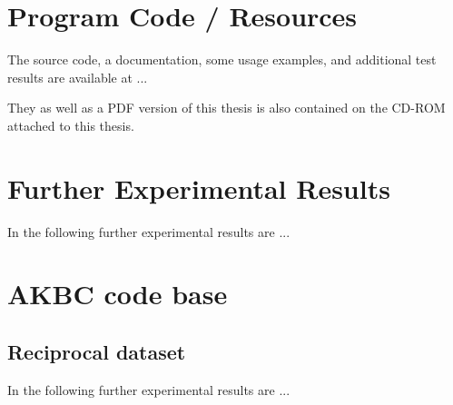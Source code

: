 \appendix



\chapter{Program Code / Resources}
\label{cha:appendix-a}

The source code, a documentation, some usage examples, and additional test results are available at ...

They as well as a PDF version of this thesis is also contained on the CD-ROM attached to this thesis.

\chapter{Further Experimental Results}
\label{cha:appendix-b}

In the following further experimental results are ...


\chapter{AKBC code base}
\label{cha:appendix-b}

\section{Reciprocal dataset}
\label{sec:AKBC Reciprocal dataset}

In the following further experimental results are ...

\newpage
